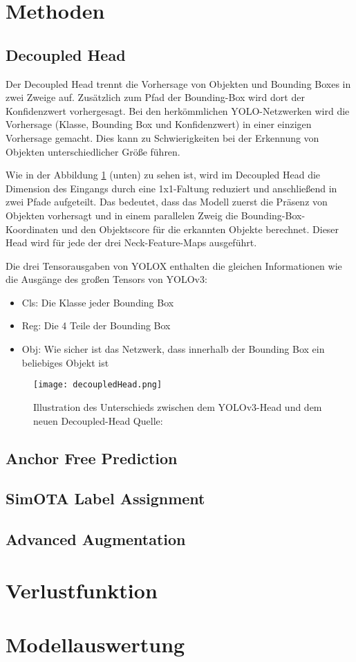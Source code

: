 \section{Methoden}
\subsection{Decoupled Head}\label{chap:decoupledHead}
Der Decoupled Head trennt die Vorhersage von Objekten und Bounding Boxes in zwei Zweige auf. Zusätzlich zum Pfad der Bounding-Box wird dort der Konfidenzwert vorhergesagt. Bei den herkömmlichen YOLO-Netzwerken wird die Vorhersage (Klasse, Bounding Box und Konfidenzwert) in einer einzigen Vorhersage gemacht. Dies kann zu Schwierigkeiten bei der Erkennung von Objekten unterschiedlicher Größe führen. 

Wie in der Abbildung \ref{fig:decoupledHead} (unten) zu sehen ist, wird im Decoupled Head die Dimension des Eingangs durch eine 1x1-Faltung reduziert und anschließend in zwei Pfade aufgeteilt. Das bedeutet, dass das Modell zuerst die Präsenz von Objekten vorhersagt und in einem parallelen Zweig die Bounding-Box-Koordinaten und den Objektscore für die erkannten Objekte berechnet. Dieser Head wird für jede der drei Neck-Feature-Maps ausgeführt. \cite{yoloxExplanationHowWorks}

Die drei Tensorausgaben von YOLOX enthalten die gleichen Informationen wie die Ausgänge des großen Tensors von YOLOv3:
\begin{itemize}
\item Cls: Die Klasse jeder Bounding Box
\item Reg: Die 4 Teile der Bounding Box
\item Obj: Wie sicher ist das Netzwerk, dass innerhalb der Bounding Box ein beliebiges Objekt ist
\end{itemize}


\begin{figure}[h]
	\centering
	\texttt{[image: decoupledHead.png]}
	\caption[Illustration des Unterschieds zwischen dem Yolov3-Head und dem neuen Decoupled-Head ]{Illustration des Unterschieds zwischen dem YOLOv3-Head und dem neuen Decoupled-Head Quelle: \cite{yoloxPaper}}
	\label{fig:decoupledHead}
\end{figure}




\subsection{Anchor Free Prediction}



\subsection{SimOTA Label Assignment}


\subsection{Advanced Augmentation}


\section{Verlustfunktion}



\section{Modellauswertung}
